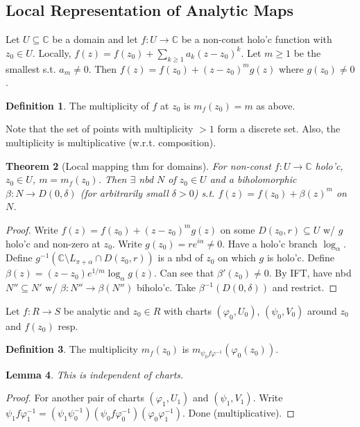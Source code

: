 \documentclass{article}
\theoremstyle{definition}
\newtheorem{defn}{Definition}[section]
\theoremstyle{remark}
\theoremstyle{plain}
\newtheorem{lem}[defn]{Lemma}
\newtheorem{thm}[defn]{Theorem}
\newcommand{\CC}{\mathbb{C}}
\begin{document}
\subsection{Local Representation of Analytic Maps}
Let $U\subseteq\CC$ be a domain and let $f:U\to\CC$ be a non-const holo'c function with $z_0\in U$. Locally, $f(z)=f(z_0)+\sum_{k\ge 1}a_k(z-z_0)^k$. Let $m\ge 1$ be the smallest s.t. $a_m\neq 0$. Then $f(z)=f(z_0)+(z-z_0)^mg(z)$ where $g(z_0)\neq 0$.
\begin{defn}
    The multiplicity of $f$ at $z_0$ is $m_f(z_0)=m$ as above.
\end{defn}
Note that the set of points with multiplicity $>1$ form a discrete set. Also, the multiplicity is multiplicative (w.r.t. composition).
\begin{thm}[Local mapping thm for domains]
    For non-const $f:U\to\CC$ holo'c, $z_0\in U$, $m=m_f(z_0)$. Then $\exists$ nbd $N$ of $z_0\in U$ and a  biholomorphic $\beta:N\to D(0,\delta)$ (for arbitrarily small $\delta>0$) s.t. $f(z)=f(z_0)+\beta(z)^m$ on $N$.
\end{thm}
\begin{proof}
    Write $f(z)=f(z_0)+(z-z_0)^mg(z)$ on some $D(z_0,r)\subseteq U$ w/ $g$ holo'c and non-zero at $z_0$. Write $g(z_0)=re^{i\alpha}\neq 0$. Have a holo'c branch $\log_\alpha$. Define $g^{-1}(\CC\setminus L_{\pi+\alpha}\cap D(z_0,r))$ is a nbd of $z_0$ on which $g$ is holo'c. Define $\beta(z)=(z-z_0)e^{1/m}\log_\alpha g(z)$. Can see that $\beta'(z_0)\neq 0$. By IFT, have nbd $N''\subseteq N'$ w/ $\beta:N''\to\beta(N'')$ biholo'c. Take $\beta^{-1}(D(0,\delta))$ and restrict.
\end{proof}
Let $f:R\to S$ be analytic and $z_0\in R$ with charts $(\varphi_0,U_0)$, $(\psi_0,V_0)$ around $z_0$ and $f(z_0) $ resp.
\begin{defn}
    The multiplicity $m_f(z_0)$ is $m_{\psi_0f\varphi^{-1}}(\varphi_0(z_0))$.
\end{defn}
\begin{lem}
    This is independent of charts.
\end{lem}
\begin{proof}
    For another pair of charts $(\varphi_1,U_1)$ and $(\psi_1,V_1)$. Write $\psi_1f\varphi_1^{-1}=(\psi_1\psi_0^{-1})(\psi_0f\varphi_0^{-1})(\varphi_0\varphi_1^{-1})$. Done (multiplicative).
\end{proof}
\end{document}
